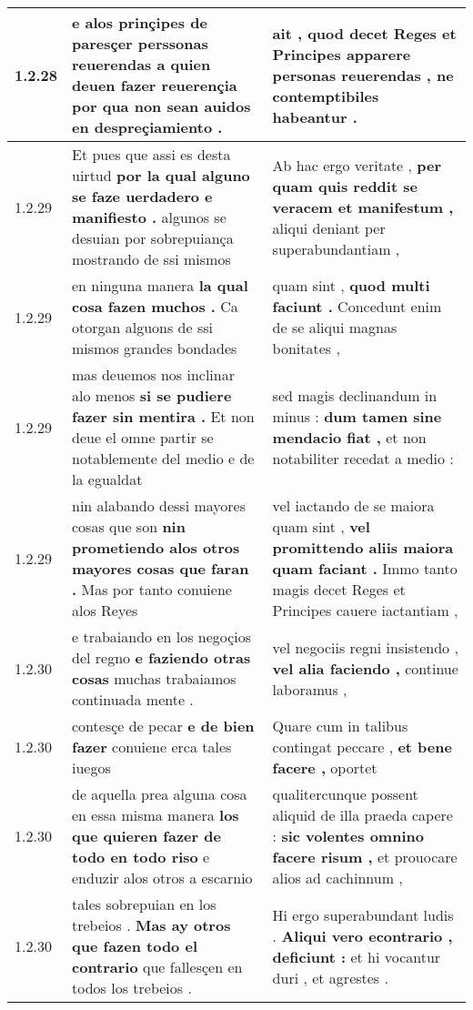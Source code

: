 \begin{tabular}{|p{1cm}|p{6.5cm}|p{6.5cm}|}
1.2.28 & e alos prinçipes de paresçer \textbf{ perssonas reuerendas a quien deuen fazer reuerençia } por qua non sean auidos en despreçiamiento . & ait , quod decet Reges et Principes \textbf{ apparere personas reuerendas , } ne contemptibiles habeantur . \\\hline
1.2.29 & Et pues que assi es desta uirtud \textbf{ por la qual alguno se faze uerdadero e manifiesto . } algunos se desuian por sobrepuiança mostrando de ssi mismos & Ab hac ergo veritate , \textbf{ per quam quis reddit se veracem et manifestum , } aliqui deniant per superabundantiam , \\\hline
1.2.29 & en ninguna manera \textbf{ la qual cosa fazen muchos . } Ca otorgan alguons de ssi mismos grandes bondades & quam sint , \textbf{ quod multi faciunt . } Concedunt enim de se aliqui magnas bonitates , \\\hline
1.2.29 & mas deuemos nos inclinar alo menos \textbf{ si se pudiere fazer sin mentira . } Et non deue el omne partir se notablemente del medio e de la egualdat & sed magis declinandum in minus : \textbf{ dum tamen sine mendacio fiat , } et non notabiliter recedat a medio : \\\hline
1.2.29 & nin alabando dessi mayores cosas que son \textbf{ nin prometiendo alos otros mayores cosas que faran . } Mas por tanto conuiene alos Reyes & vel iactando de se maiora quam sint , \textbf{ vel promittendo aliis maiora quam faciant . } Immo tanto magis decet Reges et Principes cauere iactantiam , \\\hline
1.2.30 & e trabaiando en los negoçios del regno \textbf{ e faziendo otras cosas } muchas trabaiamos continuada mente . & vel negociis regni insistendo , \textbf{ vel alia faciendo , } continue laboramus , \\\hline
1.2.30 & contesçe de pecar \textbf{ e de bien fazer } conuiene erca tales iuegos & Quare cum in talibus contingat peccare , \textbf{ et bene facere , } oportet \\\hline
1.2.30 & de aquella prea alguna cosa en essa misma manera \textbf{ los que quieren fazer de todo en todo riso } e enduzir alos otros a escarnio & qualitercunque possent aliquid de illa praeda capere : \textbf{ sic volentes omnino facere risum , } et prouocare alios ad cachinnum , \\\hline
1.2.30 & tales sobrepuian en los trebeios . \textbf{ Mas ay otros que fazen todo el contrario } que fallesçen en todos los trebeios . & Hi ergo superabundant ludis . \textbf{ Aliqui vero econtrario , deficiunt : } et hi vocantur duri , et agrestes . \\\hline

\end{tabular}
